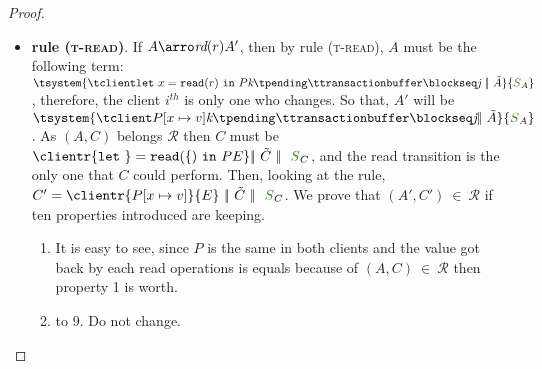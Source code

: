 \documentclass[envcountsect,runningheads,orivec]{llncs}
\begin{document}
\begin{proof}
\begin{itemize}
			
			\begin{itemize}
				\item {\bf rule (\textsc{t-read})}. If $A \arroi{\readtran{r}} A'$, then by rule (\textsc{\footnotesize{t-read}}), $A$ must be the following term: $ \tsystem{\tclienti{\treadins{x}{r}}{\tknown}{\tpending}{\ttransactionbuffer}{\tsent}{\treceivebuffer}\ \bigpar\ \tilde{A}}{\queuemessage_A}$, therefore, the client $i^{th}$ is only one who changes. So that, $A'$ will be $\tsystem{\tclienti{\update{\tprogram}{x}{v}}{\tknown}{\tpending}{\ttransactionbuffer}{\tsent}{\treceivebuffer}\bigpar\ \tilde{A}}{\queuemessage_A}$. As $(A,C)$ belongs $\mathcal{R}$ then $C$ must be $\clientr{\readins{x}{r}}{\stateclient} \bigpar\ \tilde{C} \ \bigpar\ \ \queuemessage_C$, and the read transition is the only one that $C$ could perform.
				Then, looking at the rule, $C' = \clientr{\update{P}{x}{v}}{\stateclient}\ \bigpar\ \tilde{C} \ \bigpar\ \ \queuemessage_C$. We prove that $(A',C') \ \in \ \mathcal{R}$ if ten properties introduced are keeping.				
					\begin{enumerate}
						\item It is easy to see, since $P$ is the same in both clients and the value got back by each read operations is equals because of $(A,C) \ \in \ \mathcal{R}$ then property 1 is worth. 
						\item to 9. Do not change.
						

					\end{enumerate}
	

\end{itemize}
\end{itemize}
\end{proof}
\end{document}
